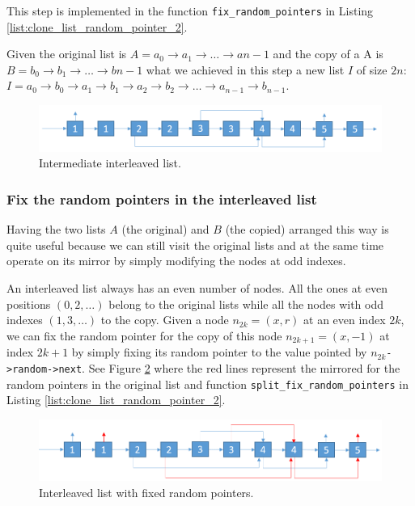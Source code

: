 This step is implemented in the function \lstinline[columns=fixed]{fix_random_pointers} in Listing \ref{list:clone_list_random_pointer_2}.

Given the original list is  $A= a_0 \rightarrow a_1 \rightarrow \ldots \rightarrow a{n-1}$ and the copy of a A is $B = b_0 \rightarrow b_1 \rightarrow \ldots \rightarrow b{n-1}$ what we achieved in this step a new list $I$ of size $2n$: $I=a_0 \rightarrow b_0 \rightarrow a_1 \rightarrow b_1 \rightarrow a_2 \rightarrow b_2 \rightarrow \ldots \rightarrow a_{n-1} \rightarrow b_{n-1}$.

\begin{figure}
	\centering
	\includegraphics[scale=0.5]{sources/clone_list_random_pointer/images/random_list_2}
	\caption{Intermediate interleaved list.}
	\label{fig:clone_list_random_pointer:interleaved}
\end{figure}


\subsubsection{Fix the random pointers in the interleaved list}
\label{clone_list_random_pointer:sec:interleaved_lists2}
Having the two lists  $A$ (the original) and $B$ (the copied) arranged this way is quite useful because we can still visit the original lists and at the same time operate on its mirror by simply modifying the nodes at odd indexes.

An interleaved list always has an even number of nodes. 
All the ones at even positions $(0,2,\ldots)$ belong to the original lists while all the nodes with odd indexes $(1,3,\ldots)$ to the copy.
Given a node $n_{2k}=(x,r)$ at an even index $2k$, we can fix the random pointer for the copy of this node $n_{2k+1}=(x,-1)$ at index $2k+1$ by simply fixing its random pointer to the value pointed by $n_{2k}$\lstinline[columns=fixed]{->random->next}. See Figure \ref{fig:clone_list_random_pointer:interleaved_fixed} where the red lines represent the mirrored for the random pointers in the original list and function \lstinline[columns=fixed]{split_fix_random_pointers} in Listing \ref{list:clone_list_random_pointer_2}.

\begin{figure}
	\centering
	\includegraphics[scale=0.5]{sources/clone_list_random_pointer/images/random_list_3}
	\caption{Interleaved list with fixed random pointers.}
	\label{fig:clone_list_random_pointer:interleaved_fixed}
\end{figure}

